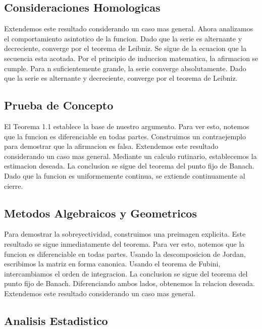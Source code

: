 \documentclass[
]{article}
\begin{document}
\subsection{Consideraciones
Homologicas}\label{consideraciones-homologicas}

Extendemos este resultado considerando un caso mas general. Ahora
analizamos el comportamiento asintotico de la funcion. Dado que la serie
es alternante y decreciente, converge por el teorema de Leibniz. Se
sigue de la ecuacion que la secuencia esta acotada. Por el principio de
induccion matematica, la afirmacion se cumple. Para n suficientemente
grande, la serie converge absolutamente. Dado que la serie es alternante
y decreciente, converge por el teorema de Leibniz.

\subsection{Prueba de Concepto}\label{prueba-de-concepto}

El Teorema 1.1 establece la base de nuestro argumento. Para ver esto,
notemos que la funcion es diferenciable en todas partes. Construimos un
contraejemplo para demostrar que la afirmacion es falsa. Extendemos este
resultado considerando un caso mas general. Mediante un calculo
rutinario, establecemos la estimacion deseada. La conclusion se sigue
del teorema del punto fijo de Banach. Dado que la funcion es
uniformemente continua, se extiende continuamente al cierre.

\subsection{Metodos Algebraicos y
Geometricos}\label{metodos-algebraicos-y-geometricos}

Para demostrar la sobreyectividad, construimos una preimagen explicita.
Este resultado se sigue inmediatamente del teorema. Para ver esto,
notemos que la funcion es diferenciable en todas partes. Usando la
descomposicion de Jordan, escribimos la matriz en forma canonica. Usando
el teorema de Fubini, intercambiamos el orden de integracion. La
conclusion se sigue del teorema del punto fijo de Banach. Diferenciando
ambos lados, obtenemos la relacion deseada. Extendemos este resultado
considerando un caso mas general.

\subsection{Analisis Estadistico}\label{analisis-estadistico}
\end{document}
